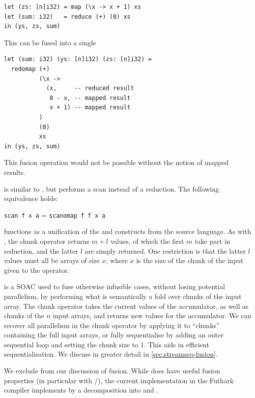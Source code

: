 \begin{description}
\begin{lstlisting}
let (zs: [n]i32) = map (\x -> x + 1) xs
let (sum: i32)   = reduce (+) (0) xs
in (ys, zs, sum)
\end{lstlisting}
  This can be fused into a single 
\begin{lstlisting}
let (sum: i32) (ys: [n]i32) (zs: [n]i32) =
  redomap (+)
          (\x ->
            (x,     -- reduced result
             0 - x, -- mapped result
             x + 1) -- mapped result
          )
          (0)
          xs
in (ys, zs, sum)
\end{lstlisting}
  This fusion operation would not be possible without the notion of
  mapped results.
\item[\kw{scanomap}] is similar to , but performs a scan
  instead of a reduction.  The following equivalence holds:\\
  \centerline{\lstinline{scan f x a} = \lstinline{scanomap f f x a}}
\item[\kw{stream\_par}] functions as a unification of the
   and  constructs from the source
  language.  As with , the chunk operator returns $m+l$
  values, of which the first $m$ take part in reduction, and the
  latter $l$ are simply returned.  One restriction is that the latter
  $l$ values must all be arrays of size $x$, where $x$ is the size of
  the chunk of the input given to the operator.
\item[\kw{stream\_seq}] is a SOAC used to fuse otherwise infusible
  cases, without losing potential parallelism, by performing what is
  semantically a fold over chunks of the input array.  The chunk
  operator takes the current values of the accumulator, as well as
  chunks of the $n$ input arrays, and returns new values for the
  accumulator.  We can recover all parallelism in the chunk operator
  by applying it to ``chunks'' containing the full input arrays, or
  fully sequentialise by adding an outer sequential loop and setting
  the chunk size to 1.  This aids in efficient sequentialisation.  We
  discuss  in greater detail in
  \cref{sec:streamseq-fusion}.
\end{description}

We exclude  from our discussion of fusion.  While
 does have useful fusion properties (in particular with
/), the current implementation in the Futhark
compiler implements  by a decomposition into  and
.

